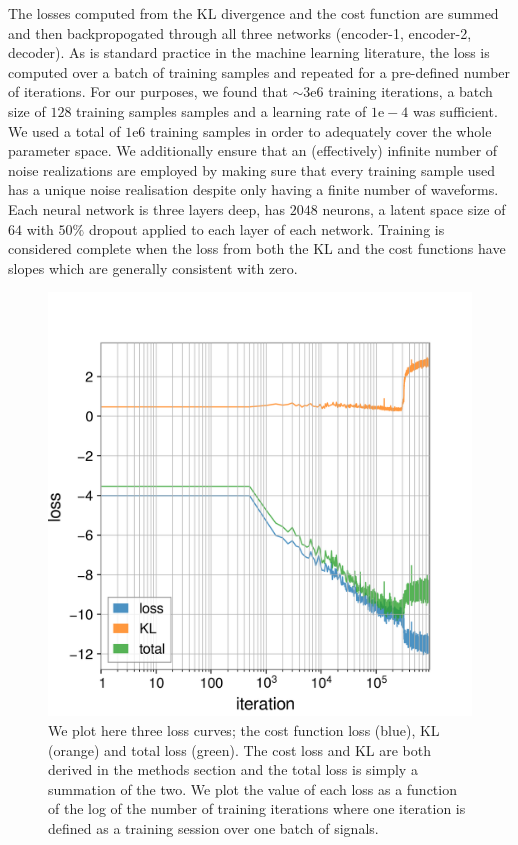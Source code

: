 \documentclass[%
showpacs,
 amsmath,amssymb,
 aps,
 twocolumn,
 prl,
 reprint,
floatfix,
]{revtex4-1}
\begin{document}
The losses computed from the KL divergence and the cost function are summed and then backpropogated through all three
networks (encoder-1, encoder-2, decoder). As is standard practice in the 
machine learning literature, the loss is computed over a batch of training 
samples and repeated for a pre-defined number of iterations. For our purposes, we found that
$\sim3\textrm{e}6$ training iterations, a batch size of $128$ training samples
samples and a learning rate of $1\textrm{e}-4$ was sufficient. We used a total of $1\textrm{e}6$ training samples in order to adequately cover the whole 
parameter space.
We additionally ensure that an (effectively) infinite number of noise
realizations are employed by making sure that every training sample used has a unique noise realisation despite only having a finite number of waveforms. 
Each neural network is three layers
deep, has $2048$ neurons, a latent space size of $64$ with $50\%$ dropout
applied to each layer of each network. Training is considered complete when 
the loss from both the KL and the cost functions have slopes which 
are generally consistent with zero.

%
%
\begin{figure}
    \includegraphics[width=\columnwidth]{images/inv_losses_log.png}
    \caption{\label{fig:loss_log} We plot here three loss curves; the cost  
    function loss (blue), KL (orange) and total loss (green). The cost  
    loss and KL are both derived in the methods section and the total 
    loss is simply a summation of the two. We plot the value of each 
    loss as a function of the log of the number of training 
    iterations where 
    one iteration is defined as a training session over one batch 
    of signals.} 
\end{figure}
\end{document}
